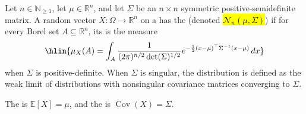 \begin{definition} \label{definition:multivariate_normal_gaussian_distribution_on_euclidean_space}
Let $n \in \mathbb{N}_{\geq 1}$, let $\mu \in \mathbb{R}^n$, and let $\Sigma$ be an $n \times n$ symmetric positive-semidefinite matrix. A random vector $X: \Omega \to \mathbb{R}^n$ on a  has the  (denoted \hl{$\mathcal{N}_n(\mu, \Sigma)$}) if for every Borel set $A \subseteq \mathbb{R}^n$, its  is the measure
$$\hlin{\mu_X(A) = \int_A \frac{1}{(2\pi)^{n/2} \det(\Sigma)^{1/2}} e^{-\frac{1}{2}(x - \mu)^\top \Sigma^{-1} (x - \mu)} \, dx}$$
when $\Sigma$ is positive-definite. When $\Sigma$ is singular, the distribution is defined as the weak limit of distributions with nonsingular covariance matrices converging to $\Sigma$.

The  is $\mathbb{E}[X] = \mu$, and the  is $\operatorname{Cov}(X) = \Sigma$.
\end{definition}
